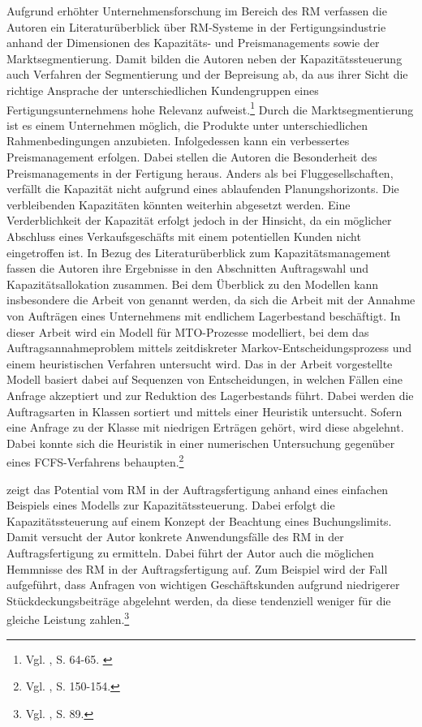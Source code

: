 Aufgrund erhöhter Unternehmensforschung im Bereich des RM verfassen die Autoren \cite{cheraghi2010revenue} ein Literaturüberblick über RM-Systeme in der Fertigungsindustrie anhand der Dimensionen des Kapazitäts- und Preismanagements sowie der Marktsegmentierung. Damit bilden die Autoren neben der Kapazitätssteuerung auch Verfahren der Segmentierung und der Bepreisung ab, da aus ihrer Sicht die richtige Ansprache der unterschiedlichen Kundengruppen eines Fertigungsunternehmens hohe Relevanz aufweist.\footnote{Vgl. \cite{cheraghi2010revenue}, S. 64-65. \label{testenvorher}} Durch die Marktsegmentierung ist es einem Unternehmen möglich, die Produkte unter unterschiedlichen Rahmenbedingungen anzubieten. Infolgedessen kann ein verbessertes Preismanagement erfolgen. Dabei stellen die Autoren die Besonderheit des Preismanagements in der Fertigung heraus. Anders als bei Fluggesellschaften, verfällt die Kapazität nicht aufgrund eines ablaufenden Planungshorizonts. Die verbleibenden Kapazitäten könnten weiterhin abgesetzt werden. Eine Verderblichkeit der Kapazität erfolgt jedoch in der Hinsicht, da ein möglicher Abschluss eines Verkaufsgeschäfts mit einem potentiellen Kunden nicht eingetroffen ist. In Bezug des Literaturüberblick zum Kapazitätsmanagement fassen die Autoren ihre Ergebnisse in den Abschnitten \glqq Auftragswahl{\grqq} und \glqq Kapazitätsallokation{\grqq} zusammen. Bei dem Überblick zu den Modellen kann insbesondere die Arbeit von \cite{Defregger:2007aa} genannt werden, da sich die Arbeit mit der Annahme von Aufträgen eines Unternehmens mit endlichem Lagerbestand beschäftigt. In dieser Arbeit wird ein Modell für MTO-Prozesse modelliert, bei dem das Auftragsannahmeproblem mittels zeitdiskreter Markov-Entscheidungsprozess und einem heuristischen Verfahren untersucht wird. Das in der Arbeit vorgestellte Modell basiert dabei auf Sequenzen von Entscheidungen, in welchen Fällen eine Anfrage akzeptiert und zur Reduktion des Lagerbestands führt. Dabei werden die Auftragsarten in Klassen sortiert und mittels einer Heuristik untersucht. Sofern eine Anfrage zu der Klasse mit niedrigen Erträgen gehört, wird diese abgelehnt. Dabei konnte sich die Heuristik in einer numerischen Untersuchung gegenüber eines FCFS-Verfahrens behaupten.\footnote{Vgl.  \cite{Defregger:2007aa}, S. 150-154.}

\cite{sucky2009revenue} zeigt das Potential vom RM in der Auftragsfertigung anhand eines einfachen Beispiels eines Modells zur Kapazitätssteuerung. Dabei erfolgt die Kapazitätssteuerung auf einem Konzept der Beachtung eines Buchungslimits. Damit versucht der Autor konkrete Anwendungsfälle des RM in der Auftragsfertigung zu ermitteln. Dabei führt der Autor auch die möglichen Hemmnisse des RM in der Auftragsfertigung auf. Zum Beispiel wird der Fall aufgeführt, dass Anfragen von wichtigen Geschäftskunden aufgrund niedrigerer Stückdeckungsbeiträge abgelehnt werden, da diese tendenziell weniger für die gleiche Leistung zahlen.\footnote{Vgl. \cite{sucky2009revenue}, S. 89.}
